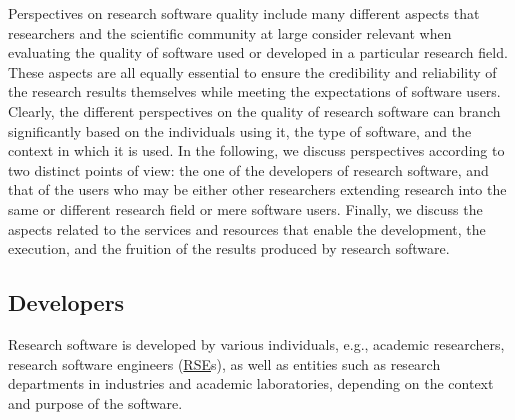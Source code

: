 Perspectives on research software quality include many different aspects that researchers and the scientific community at large consider relevant when evaluating the quality of software used or developed in a particular research field. These aspects are all equally essential to ensure the credibility and reliability of the research results themselves while meeting the expectations of software users. Clearly, the different perspectives on the quality of research software can branch significantly based on the individuals using it, the type of software, and the context in which it is used. 
In the following, we discuss perspectives according to two distinct points of view: the one of the developers of research software, and that of the users who may be either other researchers extending research into the same or different research field or mere software users. Finally, we discuss the aspects related to the services and resources that enable the development, the execution, and the fruition of the results produced by research software.  

\subsection{Developers}

Research software is developed by various individuals, e.g., academic researchers, research software engineers (\href{https://society-rse.org/}{RSE}s), as well as entities such as research departments in industries and academic laboratories, depending on the context and purpose of the software. 

